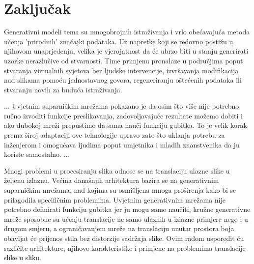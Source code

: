 \documentclass[lmodern, utf8, seminar]{fer}
\begin{document}


\chapter{Zaključak}
Generativni modeli tema su mnogobrojnih istraživanja i vrlo obećavajuća metoda učenja 'prirodnih' značajki podataka. Uz napretke koji se redovno postižu u njihovom unaprjeđenju, velika je vjerojatnost da će ubrzo biti u stanju generirati uzorke nerazlučive od stvarnosti. Time primjenu pronalaze u područjima poput stvaranja virtualnih svjetova bez ljudske intervencije, izvršavanja modifikacija nad slikama pomoću jednostavnog govora, regeneriranju oštećenih podataka ili stvaranju novih za buduća istraživanja.
\newline

...
Uvjetnim suparničkim mrežama pokazano je da osim što više nije potrebno ručno izvoditi funkcije preslikavanja, zadovoljavajuće rezultate možemo dobiti i ako dubokoj mreži prepustimo da sama nauči funkciju gubitka. To je velik korak prema široj adaptaciji ove tehnologije upravo zato što uklanja potrebu za inženjerom i omogućava ljudima poput umjetnika i mladih znanstvenika da ju koriste samostalno.
...
\newline





\begin{sazetak}
Mnogi problemi u procesiranju slika odnose se na translaciju ulazne slike u željenu izlaznu. Većina današnjih arhitektura bazira se na generativnim suparničkim mrežama, nad kojima su osmišljena mnoga proširenja kako bi se prilagodila specifičnim problemima. Uvjetnim generativnim mrežama nije potrebno definirati funkciju gubitka jer ju mogu same naučiti, kružne generativne mreže sposobne su učenju translacije ne samo ulaznih u izlazne primjere nego i u drugom smjeru, a ograničavanjem mreže na translaciju unutar prostora boja obavljat će prijenos stila bez distorzije sadržaja slike. Ovim radom usporedit ću različite arhitekture, njihove karakteristike i primjene na problemima translacije slike u sliku.

\end{sazetak}

\begin{abstract}

\end{abstract}
\end{document}
